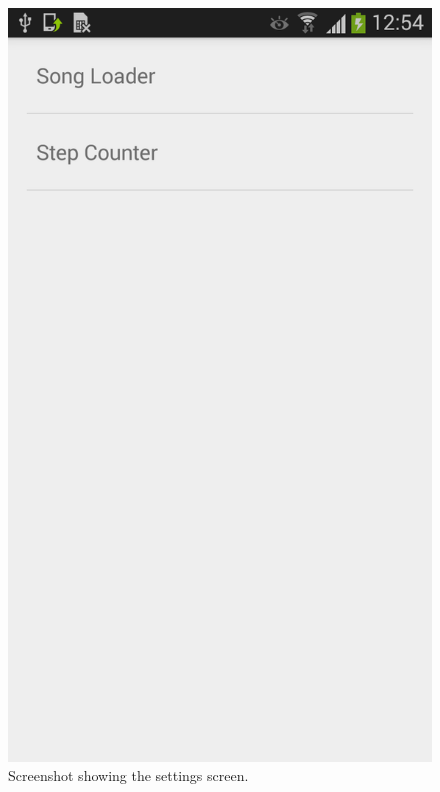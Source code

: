 \begin{figure}[h!]
  \centering
    \includegraphics[scale=0.1]{Images/Screenshots/settings.png}
  \caption{Screenshot showing the settings screen.}
  \label{fig:settings}
\end{figure}
